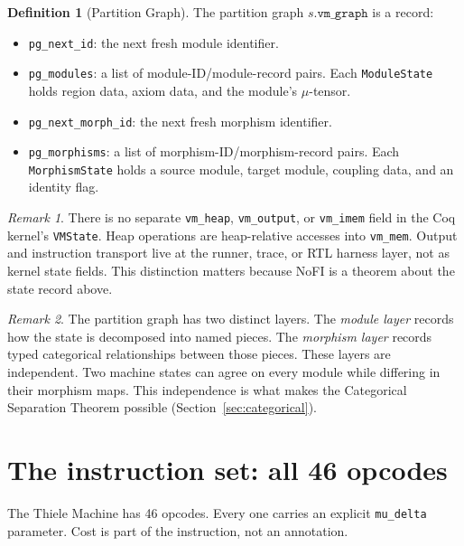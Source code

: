 \documentclass[11pt,a4paper]{article}
\theoremstyle{plain}
\theoremstyle{definition}
\newtheorem{definition}{Definition}[section]
\theoremstyle{remark}
\newtheorem{remark}{Remark}[section]
\begin{document}
\begin{definition}[Partition Graph]
The partition graph $s.\texttt{vm\_graph}$ is a record:
\begin{itemize}
\item \texttt{pg\_next\_id}: the next fresh module identifier.
\item \texttt{pg\_modules}: a list of module-ID/module-record pairs. Each \texttt{ModuleState} holds region data, axiom data, and the module's $\mu$-tensor.
\item \texttt{pg\_next\_morph\_id}: the next fresh morphism identifier.
\item \texttt{pg\_morphisms}: a list of morphism-ID/morphism-record pairs. Each \texttt{MorphismState} holds a source module, target module, coupling data, and an identity flag.
\end{itemize}
\end{definition}

\begin{remark}
There is no separate \texttt{vm\_heap}, \texttt{vm\_output}, or \texttt{vm\_imem} field in the Coq kernel's \texttt{VMState}. Heap operations are heap-relative accesses into \texttt{vm\_mem}. Output and instruction transport live at the runner, trace, or RTL harness layer, not as kernel state fields. This distinction matters because NoFI is a theorem about the state record above.
\end{remark}

\begin{remark}
The partition graph has two distinct layers. The \emph{module layer} records how the state is decomposed into named pieces. The \emph{morphism layer} records typed categorical relationships between those pieces. These layers are independent. Two machine states can agree on every module while differing in their morphism maps. This independence is what makes the Categorical Separation Theorem possible (Section~\ref{sec:categorical}).
\end{remark}

\section{The instruction set: all 46 opcodes}
\label{sec:isa}

The Thiele Machine has 46 opcodes. Every one carries an explicit \texttt{mu\_delta} parameter. Cost is part of the instruction, not an annotation.
\end{document}
